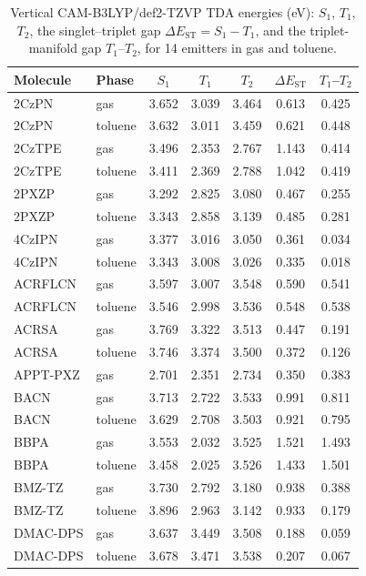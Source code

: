 \documentclass[final,3p,times,twocolumn]{elsarticle}
\begin{document}
\begin{table}[htbp]
  \centering
  \caption{Vertical CAM-B3LYP/def2-TZVP TDA energies (eV): $S_1$, $T_1$, $T_2$, the
    singlet--triplet gap $\Delta E_\text{ST}=S_1-T_1$, and the triplet-manifold gap
    $T_1$--$T_2$, for \num{14} emitters in gas and toluene.}
  \label{tab:manifold}
  \scriptsize
  \begin{tabular}{llccccc}
    \toprule
    Molecule & Phase & $S_1$ & $T_1$ & $T_2$ & $\Delta E_\text{ST}$ & $T_1$--$T_2$ \\
    \midrule
    2CzPN & gas & 3.652 & 3.039 & 3.464 & 0.613 & 0.425 \\
    2CzPN & toluene & 3.632 & 3.011 & 3.459 & 0.621 & 0.448 \\
    2CzTPE & gas & 3.496 & 2.353 & 2.767 & 1.143 & 0.414 \\
    2CzTPE & toluene & 3.411 & 2.369 & 2.788 & 1.042 & 0.419 \\
    2PXZP & gas & 3.292 & 2.825 & 3.080 & 0.467 & 0.255 \\
    2PXZP & toluene & 3.343 & 2.858 & 3.139 & 0.485 & 0.281 \\
    4CzIPN & gas & 3.377 & 3.016 & 3.050 & 0.361 & 0.034 \\
    4CzIPN & toluene & 3.343 & 3.008 & 3.026 & 0.335 & 0.018 \\
    ACRFLCN & gas & 3.597 & 3.007 & 3.548 & 0.590 & 0.541 \\
    ACRFLCN & toluene & 3.546 & 2.998 & 3.536 & 0.548 & 0.538 \\
    ACRSA & gas & 3.769 & 3.322 & 3.513 & 0.447 & 0.191 \\
    ACRSA & toluene & 3.746 & 3.374 & 3.500 & 0.372 & 0.126 \\
    APPT-PXZ & gas & 2.701 & 2.351 & 2.734 & 0.350 & 0.383 \\
    BACN & gas & 3.713 & 2.722 & 3.533 & 0.991 & 0.811 \\
    BACN & toluene & 3.629 & 2.708 & 3.503 & 0.921 & 0.795 \\
    BBPA & gas & 3.553 & 2.032 & 3.525 & 1.521 & 1.493 \\
    BBPA & toluene & 3.458 & 2.025 & 3.526 & 1.433 & 1.501 \\
    BMZ-TZ & gas & 3.730 & 2.792 & 3.180 & 0.938 & 0.388 \\
    BMZ-TZ & toluene & 3.896 & 2.963 & 3.142 & 0.933 & 0.179 \\
    DMAC-DPS & gas & 3.637 & 3.449 & 3.508 & 0.188 & 0.059 \\
    DMAC-DPS & toluene & 3.678 & 3.471 & 3.538 & 0.207 & 0.067 \\

\end{tabular}
\end{table}
\end{document}
